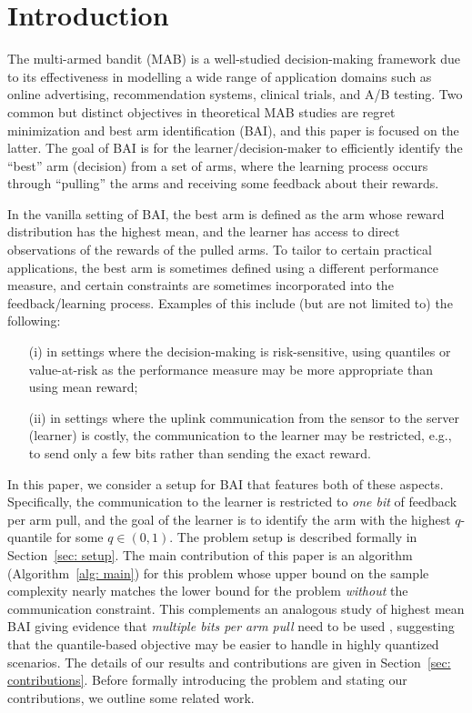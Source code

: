 \section{Introduction}
The multi-armed bandit (MAB) is a well-studied decision-making framework due to its effectiveness in modelling a wide range of application domains such as online advertising, recommendation systems, clinical trials, and A/B testing.
Two common but distinct objectives in theoretical MAB studies are regret minimization and best arm identification (BAI), and this paper is focused on the latter. 
The goal of BAI is for the learner/decision-maker to efficiently identify the ``best'' arm (decision) from a set of arms, where the learning process occurs through ``pulling'' the arms and receiving some feedback about their rewards.

In the vanilla setting of BAI, the best arm is defined as the arm whose reward distribution has the highest mean, and the learner has access to direct observations of the rewards of the pulled arms. 
To tailor to certain practical applications, the best arm is sometimes defined using a different performance measure, and certain constraints are sometimes incorporated into the feedback/learning process.
Examples of this include (but are not limited to) the following:
\begin{itemize}[topsep=0pt, itemsep=0pt]
    \item[(i)] 
    in settings where the decision-making is risk-sensitive, using quantiles or value-at-risk as the performance measure may be more appropriate than using mean reward;

    \item[(ii)]
    in settings where the uplink communication from the sensor to the server (learner) is costly, the communication to the learner may be restricted, e.g., to send only a few bits rather than sending the exact reward.
\end{itemize}
In this paper, we consider a setup for BAI that features both of these aspects. Specifically, the communication to the learner is restricted to \textit{one bit} of feedback per arm pull, and the goal of the learner is to identify the arm with the highest $q$-quantile for some $q \in (0,1)$. The problem setup is described formally in Section~\ref{sec: setup}. The main contribution of this paper is an algorithm (Algorithm~\ref{alg: main}) for this problem whose upper bound on the sample complexity nearly matches the lower bound for the problem \textit{without} the communication constraint.  This complements an analogous study of highest mean BAI giving evidence that \emph{multiple bits per arm pull} need to be used \cite{hanna2022solving}, suggesting that the quantile-based objective may be easier to handle in highly quantized scenarios.  
The details of our results and contributions are given in Section~\ref{sec: contributions}. 
Before formally introducing the problem and stating our contributions, we outline some related work.




